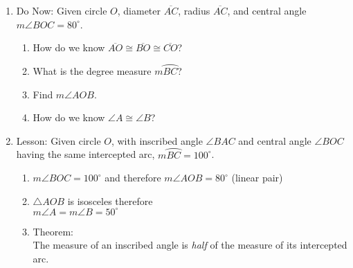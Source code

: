 \documentclass[12pt, twoside]{article}
\begin{document}
\begin{enumerate}
\newpage
\item Do Now: Given circle $O$, diameter $\overline {AC}$, radius $\overline {AC}$, and central angle $m\angle BOC= 80^\circ$.
    \begin{multicols}{2}
    \raggedcolumns
    \begin{enumerate}[itemsep=1cm]
      \item How do we know $\overline {AO} \cong \overline {BO} \cong \overline {CO}$?
      \item What is the degree measure $m \wideparen{BC}$?
      \item Find $m\angle AOB$.
      \item How do we know $\angle A \cong \angle B$?
    \end{enumerate}
    \end{multicols}
  
\newpage
\item Lesson: Given circle $O$, with inscribed angle $\angle BAC$ and central angle $\angle BOC$ having the same intercepted arc, $m \wideparen{BC}= 100^\circ$.
    \begin{multicols}{2}
    \raggedcolumns
    \begin{enumerate}[itemsep=1cm]
      \item $m\angle BOC = 100^\circ$ and therefore $m\angle AOB = 80^\circ$ (linear pair)
      \item $\triangle AOB$ is isosceles therefore\\ $m \angle A = m \angle B = 50^\circ$
      \item Theorem: \\The measure of an inscribed angle is \emph{half} of the measure of its intercepted arc.
    \end{enumerate}
    \end{multicols}


\end{enumerate}
\end{document}
